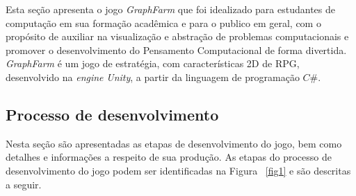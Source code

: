 \documentclass[10pt, conference, compsocconf]{IEEEtran}
\begin{document}
Esta seção apresenta o jogo \textit{GraphFarm} que foi idealizado para estudantes de computação em sua formação acadêmica e para o publico em geral, com o propósito de auxiliar na visualização e abstração de problemas computacionais e promover o desenvolvimento do Pensamento Computacional de forma divertida. \textit{GraphFarm} é um jogo de estratégia, com características 2D de RPG, desenvolvido na \textit{engine} \textit{Unity}, a partir da linguagem de programação $C\# $.


\subsection{Processo de desenvolvimento}

Nesta seção são apresentadas as etapas de desenvolvimento do jogo, bem como detalhes e informações a respeito de sua produção. As etapas do processo de desenvolvimento do jogo podem ser identificadas na Figura ~\ref{fig1} e são descritas a seguir.
\end{document}

